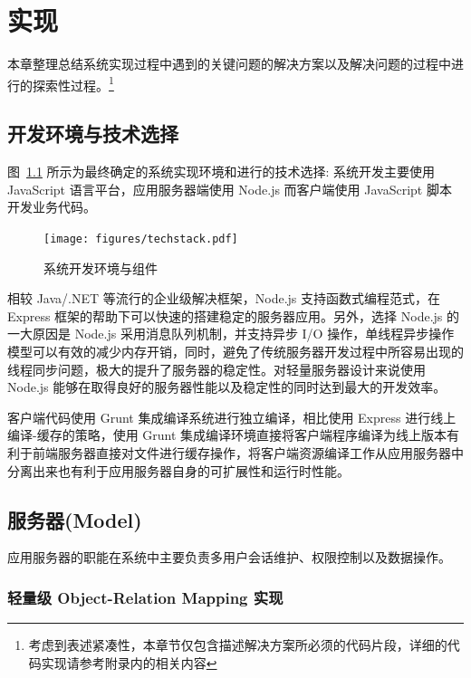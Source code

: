 \chapter{实现}

本章整理总结系统实现过程中遇到的关键问题的解决方案以及解决问题的过程中进行的探索性过程。\footnote{考虑到表述紧凑性，本章节仅包含描述解决方案所必须的代码片段，详细的代码实现请参考附录内的相关内容}

\section{开发环境与技术选择}

图~\ref{TechStack} 所示为最终确定的系统实现环境和进行的技术选择: 系统开发主要使用 JavaScript 语言平台，应用服务器端使用 Node.js 而客户端使用 JavaScript 脚本开发业务代码。

\begin{figure}[!h]
  \begin{center}
    \texttt{[image: figures/techstack.pdf]}
    \caption{系统开发环境与组件\label{TechStack}}
  \end{center}
\end{figure}

相较 Java/.NET 等流行的企业级解决框架，Node.js 支持函数式编程范式，在 Express 框架的帮助下可以快速的搭建稳定的服务器应用。另外，选择 Node.js 的一大原因是 Node.js 采用消息队列机制，并支持异步 I/O 操作，单线程异步操作模型可以有效的减少内存开销，同时，避免了传统服务器开发过程中所容易出现的线程同步问题，极大的提升了服务器的稳定性。对轻量服务器设计来说使用 Node.js 能够在取得良好的服务器性能以及稳定性的同时达到最大的开发效率。

客户端代码使用 Grunt 集成编译系统进行独立编译，相比使用 Express 进行线上编译-缓存的策略，使用 Grunt 集成编译环境直接将客户端程序编译为线上版本有利于前端服务器直接对文件进行缓存操作，将客户端资源编译工作从应用服务器中分离出来也有利于应用服务器自身的可扩展性和运行时性能。

\section{服务器(Model)}

应用服务器的职能在系统中主要负责多用户会话维护、权限控制以及数据操作。

\subsection{轻量级 Object-Relation Mapping 实现}

